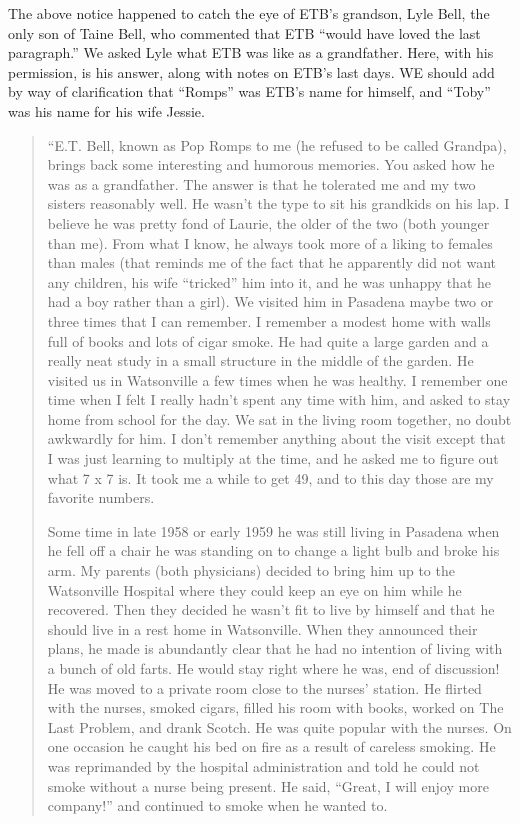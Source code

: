 The above notice happened to catch the eye of ETB's grandson, Lyle Bell,
the only son of Taine Bell, who commented that ETB ``would have loved
the last paragraph.'' We asked Lyle what ETB was like as a grandfather.
Here, with his permission, is his answer, along with notes on ETB's last
days. WE should add by way of clarification that ``Romps'' was ETB's
name for himself, and ``Toby'' was his name for his wife Jessie.
\begin{quote}
``E.T. Bell, known as Pop Romps to me (he refused to be called Grandpa),
brings back some interesting and humorous memories. You asked how he was
as a grandfather. The answer is that he tolerated me and my two sisters
reasonably well. He wasn't the type to sit his grandkids on his lap. I
believe he was pretty fond of Laurie, the older of the two (both younger
than me). From what I know, he always took more of a liking to females
than males (that reminds me of the fact that he apparently did not want
any children, his wife ``tricked'' him into it, and he was unhappy that
he had a boy rather than a girl). We visited him in Pasadena maybe two
or three times that I can remember. I remember a modest home with walls
full of books and lots of cigar smoke. He had quite a large garden and a
really neat study in a small structure in the middle of the garden. He
visited us in Watsonville a few times when he was healthy. I remember
one time when I felt I really hadn't spent any time with him, and asked
to stay home from school for the day. We sat in the living room
together, no doubt awkwardly for him. I don't remember anything about
the visit except that I was just learning to multiply at the time, and
he asked me to figure out what 7 x 7 is. It took me a while to get 49,
and to this day those are my favorite numbers.

Some time in late 1958 or early 1959 he was still living in Pasadena
when he fell off a chair he was standing on to change a light bulb and
broke his arm. My parents (both physicians) decided to bring him up to
the Watsonville Hospital where they could keep an eye on him while he
recovered. Then they decided he wasn't fit to live by himself and that
he should live in a rest home in Watsonville. When they announced their
plans, he made is abundantly clear that he had no intention of living
with a bunch of old farts. He would stay right where he was, end of
discussion! He was moved to a private room close to the nurses' station.
He flirted with the nurses, smoked cigars, filled his room with books,
worked on The Last Problem, and drank Scotch. He was quite popular with
the nurses. On one occasion he caught his bed on fire as a result of
careless smoking. He was reprimanded by the hospital administration and
told he could not smoke without a nurse being present. He said, ``Great,
I will enjoy more company!'' and continued to smoke when he wanted to.


\end{quote}
